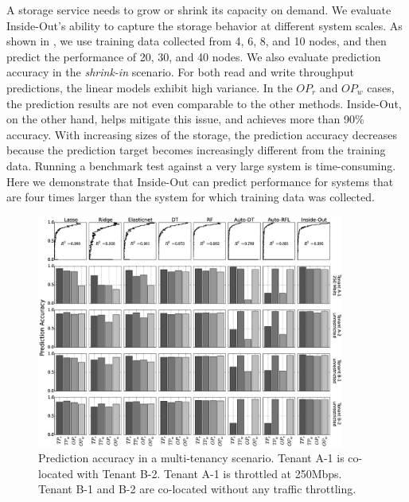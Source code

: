 A storage service needs to grow or shrink its capacity on demand.
We evaluate Inside-Out's ability to capture the storage behavior at different system scales.
As shown in \myfigure{\ref{fig:elasticity}}, we use training data collected from 
4, 6, 8, and 10 nodes, and then predict the performance of 20, 30, and 40 nodes.
We also evaluate prediction accuracy in the \emph{shrink-in} scenario.
For both read and write throughput predictions, the linear models exhibit high variance.
In the $OP_r$ and $OP_w$ cases, the prediction results are not even comparable to the other methods.
Inside-Out, on the other hand, helps mitigate this issue, and achieves more than 90\% accuracy.
With increasing sizes of the storage, the prediction accuracy decreases because the prediction target 
becomes increasingly different from the training data.
Running a benchmark test against a very large system is time-consuming.
Here we demonstrate that Inside-Out can predict performance for systems that are 
four times larger than the system for which training data was collected.

\begin{figure}
    \centering
    \includegraphics[width=0.9\textwidth]{Chapter-InsideOut/figures/multi_tenancy_all_new.eps}
    \caption{Prediction accuracy in a multi-tenancy scenario. Tenant A-1 is co-located with Tenant B-2. Tenant A-1 is throttled at 250Mbps. Tenant B-1 and B-2 are co-located without any traffic throttling.}
    \label{fig:multi_tenancy}
\end{figure}


